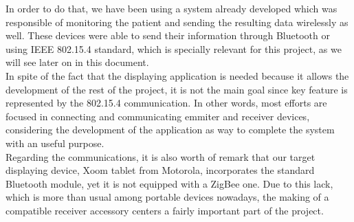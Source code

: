 				
		In order to do that, we have been using a system already developed which
		was responsible of monitoring the patient and sending the resulting data wirelessly as well. These
		devices were able to send their information through Bluetooth or using IEEE 802.15.4 standard, which
		is specially relevant for this project, as we will see later on in this document.\\ %
		

		In spite of the fact that the displaying application is needed because it allows the development of
		the rest of the project, it is not the main goal since key feature is represented by the 802.15.4
		communication. In other words, most efforts are focused in connecting and communicating emmiter and
		receiver devices, considering the development of the application as way to complete the system with 
		an useful purpose.\\ %

		Regarding the communications, it is also worth of remark that our target displaying device, Xoom tablet 
		from Motorola, incorporates the standard Bluetooth module, yet it is not equipped with a ZigBee one.
		Due to this lack, which is more than usual among portable devices nowadays, the making of a compatible 
		receiver accessory centers a fairly important part of the project.\\ %

